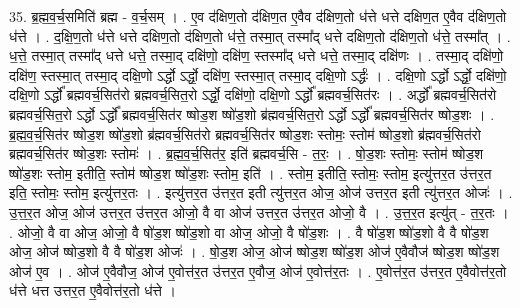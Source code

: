 \documentclass[17pt]{extarticle}
\begin{document}
35. ब्र॒ह्म॒व॒र्च॒समिति॑ ब्रह्म - व॒र्च॒सम् । . ए॒व द॑क्षिण॒तो द॑क्षिण॒त ए॒वैव द॑क्षिण॒तो ध॑त्ते धत्ते दक्षिण॒त ए॒वैव द॑क्षिण॒तो ध॑त्ते । . द॒क्षि॒ण॒तो ध॑त्ते धत्ते दक्षिण॒तो द॑क्षिण॒तो ध॑त्ते॒ तस्मा॒त् तस्मा᳚द् धत्ते दक्षिण॒तो द॑क्षिण॒तो ध॑त्ते॒ तस्मा᳚त् । . ध॒त्ते॒ तस्मा॒त् तस्मा᳚द् धत्ते धत्ते॒ तस्मा॒द् दक्षि॑णो॒ दक्षि॑ण॒ स्तस्मा᳚द् धत्ते धत्ते॒ तस्मा॒द् दक्षि॑णः । . तस्मा॒द् दक्षि॑णो॒ दक्षि॑ण॒ स्तस्मा॒त् तस्मा॒द् दक्षि॒णो ऽर्द्धो ऽर्द्धो॒ दक्षि॑ण॒ स्तस्मा॒त् तस्मा॒द् दक्षि॒णो ऽर्द्धः॑ । . दक्षि॒णो ऽर्द्धो ऽर्द्धो॒ दक्षि॑णो॒ दक्षि॒णो ऽर्द्धो᳚ ब्रह्मवर्च॒सित॑रो ब्रह्मवर्च॒सित॒रो ऽर्द्धो॒ दक्षि॑णो॒ दक्षि॒णो ऽर्द्धो᳚ ब्रह्मवर्च॒सित॑रः । . अर्द्धो᳚ ब्रह्मवर्च॒सित॑रो ब्रह्मवर्च॒सित॒रो ऽर्द्धो ऽर्द्धो᳚ ब्रह्मवर्च॒सित॑र ष्षोड॒श ष्षो॑ड॒शो ब्र॑ह्मवर्च॒सित॒रो ऽर्द्धो ऽर्द्धो᳚ ब्रह्मवर्च॒सित॑र ष्षोड॒शः । . ब्र॒ह्म॒व॒र्च॒सित॑र ष्षोड॒श ष्षो॑ड॒शो ब्र॑ह्मवर्च॒सित॑रो ब्रह्मवर्च॒सित॑र ष्षोड॒शः स्तोमः॒ स्तोम॑ ष्षोड॒शो ब्र॑ह्मवर्च॒सित॑रो ब्रह्मवर्च॒सित॑र ष्षोड॒शः स्तोमः॑ । . ब्र॒ह्म॒व॒र्च॒सित॑र॒ इति॑ ब्रह्मवर्च॒सि - त॒रः॒ । . षो॒ड॒शः स्तोमः॒ स्तोम॑ ष्षोड॒श ष्षो॑ड॒शः स्तोम॒ इतीति॒ स्तोम॑ ष्षोड॒श ष्षो॑ड॒शः स्तोम॒ इति॑ । . स्तोम॒ इतीति॒ स्तोमः॒ स्तोम॒ इत्यु॑त्तर॒त उ॑त्तर॒त इति॒ स्तोमः॒ स्तोम॒ इत्यु॑त्तर॒तः । . इत्यु॑त्तर॒त उ॑त्तर॒त इती त्यु॑त्तर॒त ओज॒ ओज॑ उत्तर॒त इती त्यु॑त्तर॒त ओजः॑ । . उ॒त्त॒र॒त ओज॒ ओज॑ उत्तर॒त उ॑त्तर॒त ओजो॒ वै वा ओज॑ उत्तर॒त उ॑त्तर॒त ओजो॒ वै । . उ॒त्त॒र॒त इत्यु॑त् - त॒र॒तः । . ओजो॒ वै वा ओज॒ ओजो॒ वै षो॑ड॒श ष्षो॑ड॒शो वा ओज॒ ओजो॒ वै षो॑ड॒शः । . वै षो॑ड॒श ष्षो॑ड॒शो वै वै षो॑ड॒श ओज॒ ओज॑ ष्षोड॒शो वै वै षो॑ड॒श ओजः॑ । . षो॒ड॒श ओज॒ ओज॑ ष्षोड॒श ष्षो॑ड॒श ओज॑ ए॒वैवौज॑ ष्षोड॒श ष्षो॑ड॒श ओज॑ ए॒व । . ओज॑ ए॒वैवौज॒ ओज॑ ए॒वोत्त॑र॒त उ॑त्तर॒त ए॒वौज॒ ओज॑ ए॒वोत्त॑र॒तः । . ए॒वोत्त॑र॒त उ॑त्तर॒त ए॒वैवोत्त॑र॒तो ध॑त्ते धत्त उत्तर॒त ए॒वैवोत्त॑र॒तो ध॑त्ते । \newline
\end{document}

